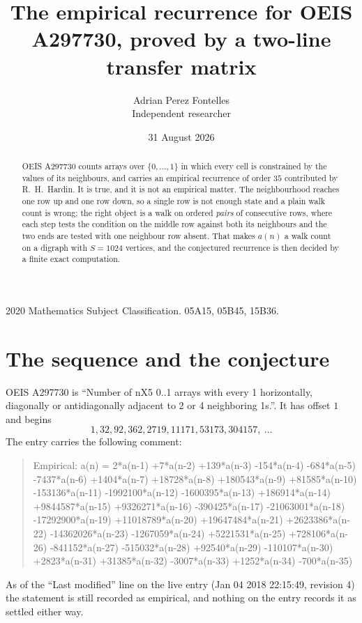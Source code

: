 \documentclass[11pt,a4paper]{article}
\title{The empirical recurrence for OEIS A297730, proved by a two-line transfer matrix}
\author{Adrian Perez Fontelles\\ \small Independent researcher}
\date{31 August 2026}
\theoremstyle{plain}
\theoremstyle{definition}
\begin{document}
\maketitle

\begin{abstract}
OEIS A297730 counts arrays over $\{0,\dots,1\}$ in which every cell is constrained by the
values of its neighbours, and carries an empirical recurrence of order $35$ contributed
by R.~H.~Hardin. It is true, and it is not an empirical matter. The neighbourhood reaches one
row up and one row down, so a single row is not enough state and a plain walk count
is wrong; the right object is a walk on ordered \emph{pairs} of consecutive rows, where
each step tests the condition on the middle row against both its neighbours and the two
ends are tested with one neighbour row absent. That makes $a(n)$ a walk count on a digraph
with $S=1024$ vertices, and the conjectured recurrence is then decided by a finite exact
computation.
\end{abstract}

\noindent\small 2020 Mathematics Subject Classification. 05A15, 05B45, 15B36.\normalsize

\section{The sequence and the conjecture}

OEIS A297730 is ``Number of nX5 0..1 arrays with every 1 horizontally, diagonally or antidiagonally adjacent to 2 or 4 neighboring 1s.''. It has offset $1$ and begins
\[
1, 32, 92, 362, 2719, 11171, 53173, 304157,\ \dots
\]
The entry carries the following comment:
\begin{quote}\small
Empirical: a(n) = 2*a(n-1) +7*a(n-2) +139*a(n-3) -154*a(n-4) -684*a(n-5) -7437*a(n-6) +1404*a(n-7) +18728*a(n-8) +180543*a(n-9) +81585*a(n-10) -153136*a(n-11) -1992100*a(n-12) -1600395*a(n-13) +186914*a(n-14) +9844587*a(n-15) +9326271*a(n-16) -390425*a(n-17) -21063001*a(n-18) -17292900*a(n-19) +11018789*a(n-20) +19647484*a(n-21) +2623386*a(n-22) -14362026*a(n-23) -1267059*a(n-24) +5221531*a(n-25) +728106*a(n-26) -841152*a(n-27) -515032*a(n-28) +92540*a(n-29) -110107*a(n-30) +2823*a(n-31) +31385*a(n-32) -3007*a(n-33) +1252*a(n-34) -700*a(n-35)
\end{quote}
As of the ``Last modified'' line on the live entry (Jan 04 2018 22:15:49, revision 4) the statement is
still recorded as empirical, and nothing on the entry records it as settled either way.
\end{document}
